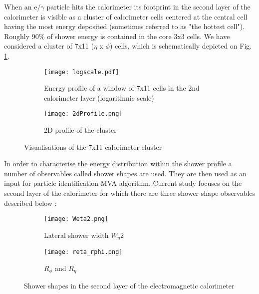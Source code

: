   When an e/$\gamma$ particle hits the calorimeter its footprint in the second layer of the calorimeter is visible as a cluster of calorimeter cells centered at the central cell having the most energy deposited (sometimes referred to as "the hottest cell"). Roughly 90$\%$ of shower energy is contained in the core 3x3 cells.  We have considered a cluster of 7x11 ($\eta$ x $\phi$) cells, which is schematically depicted on Fig. \ref{fig::profile_log}.
  
  
    	\begin{figure}[htbp]
  	\begin{subfigure}[t]{0.5\textwidth}
  		\texttt{[image: logscale.pdf]}
  		\caption{Energy profile of a window of 7x11 cells in the 2nd calorimeter layer (logarithmic scale)}
  		\label{fig::profile_log}
  	\end{subfigure}
  	\hfill
  	\begin{subfigure}[t]{0.5\textwidth} 
  		\texttt{[image: 2dProfile.png]}
  		\caption{2D profile of the cluster}
  		\label{fig::2d_profile}
  	\end{subfigure}
  	\caption{Visualisations of the 7x11 calorimeter cluster}
  	\label{fig::profiles}
  \end{figure}
  
  In order to characterise the energy distribution within the shower profile a number of observables called shower shapes are used. They are then used as an input for particle identification MVA algorithm. Current study focuses on the second layer of the calorimeter for which there are three shower shape observables described below \cite{egamma_perf_2017}:
  
    	\begin{figure}[htbp]
  	\begin{subfigure}[t]{0.4\textwidth}
  		\texttt{[image: Weta2.png]}
  		\caption[Lateral shower width $W_{\eta} 2$]{Lateral shower width $W_{\eta} 2$}
  		\label{fig::weta2}
  	\end{subfigure}
  	\hfill
  	\begin{subfigure}[t]{0.25\textwidth} 
  		\texttt{[image: reta\_rphi.png]}
  		\caption[$R_{\phi}$ and $R_{\eta}$]{$R_{\phi}$ and $R_{\eta}$}
  		\label{fig::reta_rphi}
  	\end{subfigure}
  	\caption{Shower shapes in the second layer of the electromagnetic calorimeter}
  	\label{fig::sshapes}
  \end{figure}
  
